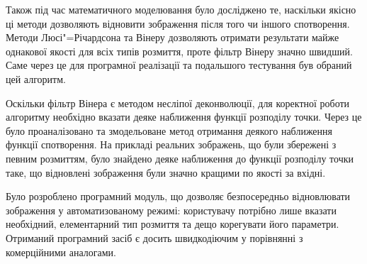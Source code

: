 \documentclass{diploma}
\begin{document}
  Також під час математичного моделювання було досліджено те, наскільки якісно
  ці методи дозволяють відновити зображення після того чи іншого спотворення.
  Методи Люсі"=Річардсона та Вінеру дозволяють отримати результати майже
  однакової якості для всіх типів розмиття, проте фільтр Вінеру значно
  швидший.
  Саме через це для програмної реалізації та подальшого тестування був обраний
  цей алгоритм.

  Оскільки фільтр Вінера є методом несліпої деконволюції, для коректної роботи
  алгоритму необхідно вказати деяке наближення функції розподілу точки.
  Через це було проаналізовано та змодельоване метод отримання деякого
  наближення функції спотворення.
  На прикладі реальних зображень, що були збережені з певним розмиттям, було
  знайдено деяке наближення до функції розподілу точки таке, що відновлені
  зображення були значно кращими по якості за вхідні.

  Було розроблено програмний модуль, що дозволяє безпосередньо відновлювати
  зображення у автоматизованому режимі: користувачу потрібно лише вказати
  необхідний, елементарний тип розмиття та дещо корегувати його параметри.
  Отриманий програмний засіб є досить швидкодіючим у порівнянні з комерційними
  аналогами.
\end{document}
